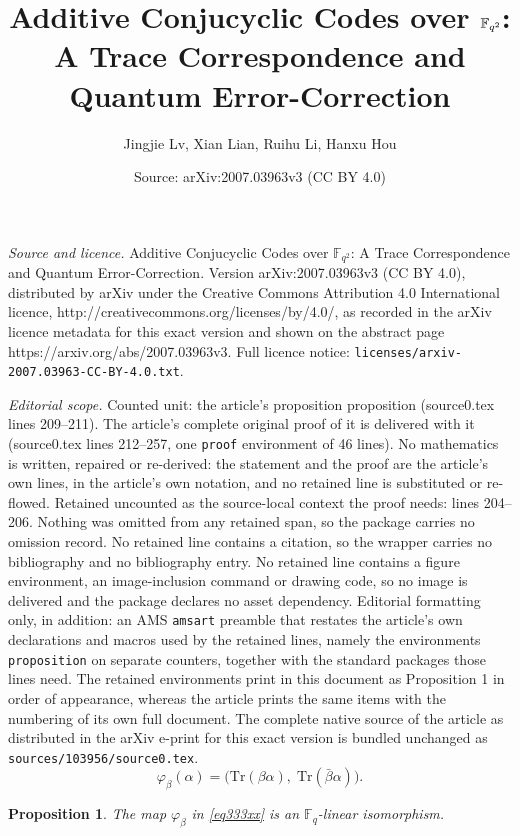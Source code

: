 \documentclass[10pt,a4paper]{amsart}
\title{Additive Conjucyclic Codes over $\F_{q^2}$: A Trace Correspondence and Quantum Error-Correction}
\author{Jingjie Lv, Xian Lian, Ruihu Li, Hanxu Hou}
\date{Source: arXiv:2007.03963v3 (CC BY 4.0)}
\newtheorem{proposition}{Proposition}
\newcommand{\F}{\mathbb{F}}
\newcommand{\Tr}{\mathrm{Tr}}
\begin{document}
\maketitle

\noindent\emph{Source and licence.} Additive Conjucyclic Codes over $\F_{q^2}$: A Trace Correspondence and Quantum Error-Correction. Version arXiv:2007.03963v3 (CC BY 4.0), distributed by arXiv under the Creative Commons Attribution 4.0 International licence, http://creativecommons.org/licenses/by/4.0/, as recorded in the arXiv licence metadata for this exact version and shown on the abstract page https://arxiv.org/abs/2007.03963v3. Full licence notice: \texttt{licenses/arxiv-2007.03963-CC-BY-4.0.txt}.\par\smallskip

\noindent\textit{Editorial scope.} Counted unit: the article's proposition proposition (source0.tex lines 209--211). The article's complete original proof of it is delivered with it (source0.tex lines 212--257, one \texttt{proof} environment of 46 lines). No mathematics is written, repaired or re-derived: the statement and the proof are the article's own lines, in the article's own notation, and no retained line is substituted or re-flowed.  Retained uncounted as the source-local context the proof needs: lines 204--206.  Nothing was omitted from any retained span, so the package carries no omission record.  No retained line contains a citation, so the wrapper carries no bibliography and no bibliography entry.  No retained line contains a figure environment, an image-inclusion command or drawing code, so no image is delivered and the package declares no asset dependency.  Editorial formatting only, in addition: an AMS \texttt{amsart} preamble that restates the article's own declarations and macros used by the retained lines, namely the environments \texttt{proposition} on separate counters, together with the standard packages those lines need.  The retained environments print in this document as Proposition 1 in order of appearance, whereas the article prints the same items with the numbering of its own full document.  The complete native source of the article as distributed in the arXiv e-print for this exact version is bundled unchanged as \texttt{sources/103956/source0.tex}.
\begin{equation}\label{eq333xx}
\varphi_\beta(\alpha) = \bigl( \Tr(\beta\alpha),\; \Tr(\bar{\beta}\alpha) \bigr).
\end{equation}

\begin{proposition}
	The map $\varphi_\beta$ in \eqref{eq333xx} is an $\F_q$-linear isomorphism.
\end{proposition}
\end{document}
